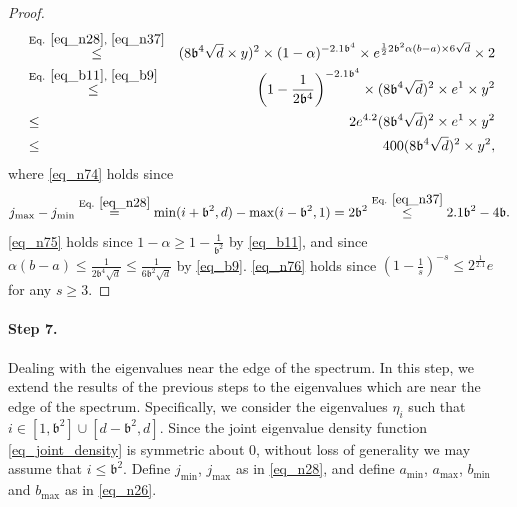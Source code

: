 \documentclass[11pt,letterpaper]{article}
\begin{document}
\begin{proof}
\begin{eqnarray}
  &\stackrel{\textrm{Eq. } \eqref{eq_n28}, \, \, \eqref{eq_n37}}{\leq}& ( 8 \mathfrak{b}^4 \sqrt{d}  \times y)^2 \times (1-\alpha)^{-2.1\mathfrak{b}^4} \times e^{\frac{1}{2}2\mathfrak{b}^2\alpha(b-a)\times 6\sqrt{d}} \times 2 \label{eq_n74}\\
     &\stackrel{\textrm{Eq. } \eqref{eq_b11},\,\, \eqref{eq_b9}}{\leq}& \left(1- \frac{1}{2\mathfrak{b}^4}\right)^{-2.1\mathfrak{b}^4}\times (8 \mathfrak{b}^4 \sqrt{d})^2 \times e^1 \times y^2 \label{eq_n75}\\
%
   &\leq & 2 e^{4.2} (8 \mathfrak{b}^4 \sqrt{d})^2 \times e^1 \times y^2 \label{eq_n76}\\
 &\leq & 400 (8 \mathfrak{b}^4 \sqrt{d})^2 \times y^2,  \label{eq_n181}
\end{eqnarray}
%
%
%
where \eqref{eq_n74} holds since 
$$j_{\mathrm{max}} -  j_{\mathrm{min}} \stackrel{\textrm{Eq. } \eqref{eq_n28}}{=}  \min(i+\mathfrak{b}^2, d) -  \max(i-\mathfrak{b}^2, 1) =  2 \mathfrak{b}^2 \stackrel{\textrm{Eq. } \eqref{eq_n37}}{\leq} 2.1 \mathfrak{b}^2 - 4 \mathfrak{b}.$$
%
\eqref{eq_n75} holds since  $1-\alpha \geq 1- \frac{1}{\mathfrak{b}^2}$ by \eqref{eq_b11}, and since $\alpha (b-a)\leq \frac{1}{2\mathfrak{b}^4\sqrt{d}}\leq \frac{1}{6\mathfrak{b}^2\sqrt{d}}$ by \eqref{eq_b9}.
%
\eqref{eq_n76} holds since $\left(1- \frac{1}{s}\right)^{-s} \leq 2^{\frac{1}{2.1}}e$ for any $s \geq 3$.
%
\end{proof}



\paragraph{Step 7.} Dealing with the eigenvalues near the edge of the spectrum.
In this step, we extend the results of the previous steps to the eigenvalues which are near the edge of the spectrum.
%
 Specifically, we consider the eigenvalues $\eta_i$ such that $i \in  [1, \mathfrak{b}^2] \cup [d-\mathfrak{b}^2, d]$. 
%
  Since the joint eigenvalue density function \eqref{eq_joint_density} is symmetric about 0, without loss of generality we may assume that $i \leq \mathfrak{b}^2$.
%
Define  $j_{\mathrm{min}}$,  $j_{\mathrm{max}}$ as in \eqref{eq_n28},  and define $a_{\mathrm{min}}$,   $a_{\mathrm{max}}$, $b_{\mathrm{min}}$ and $b_{\mathrm{max}}$ as in \eqref{eq_n26}.
\end{document}
